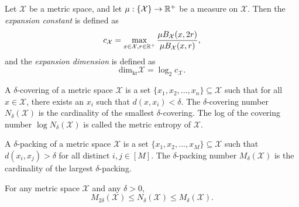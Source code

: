 \documentclass[../main.tex]{subfiles}
\newcommand{\set}[1]{\mathcal {#1}}
\newcommand{\radius}{r}
\newcommand{\dist}[2]{\distf({#1},{#2})}
\newcommand{\distf}{d}
\newcommand{\krdim}{\text{dim}_\text{kr}}
\begin{document}
\begin{definition}
    Let $\set X$ be a metric space, and let $\mu : \{\set X\} \to \R^+$ be a measure on $\set X$.
    Then the \emph{expansion constant} is defined as
    \begin{equation}
        c_\set X = \max_{x\in\set X, \radius\in\R^+} \frac{\mu B_{\set X}(x,2\radius)}{\mu B_{\set X}(x,\radius)}
        ,
    \end{equation}
    and the \emph{expansion dimension} is defined as
    \begin{equation}
        \krdim\set X = \log_2 c_\set X
        .
    \end{equation}
\end{definition}


\begin{definition}
    A $\delta$-covering of a metric space $\set X$ is a set $\{x_1,x_2,...,x_n\} \subseteq \set X$ such that for all $x\in\set X$, there exists an $x_i$ such that $\dist{x}{x_i} < \delta$.
    The $\delta$-covering number $N_\delta(\set X)$ is the cardinality of the smallest $\delta$-covering.
    The log of the covering number $\log N_\delta(\set X)$ is called the metric entropy of $\set X$.
\end{definition}

\begin{definition}
A $\delta$-packing of a metric space $\set X$ is a set $\{x_1,x_2,...,x_M\} \subseteq \set X$ such that $\dist{x_i}{x_j} > \delta$ for all distinct $i,j\in[M]$.
The $\delta$-packing number $M_\delta (\set X)$ is the cardinality of the largest $\delta$-packing.
\end{definition}

\begin{lemma}
    \label{lemma:coverpacking}
    For any metric space $\set X$ and any $\delta>0$,
    \begin{equation}
        M_{2\delta}(\set X) \le N_\delta(\set X) \le M_{\delta}(\set X)
        .
    \end{equation}
\end{lemma}
\end{document}
